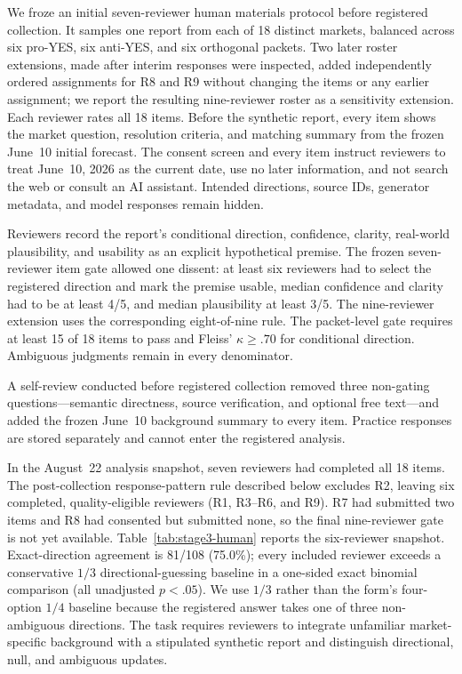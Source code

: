 We froze an initial seven-reviewer human materials protocol before registered
collection. It samples one report from each of 18 distinct markets, balanced
across six pro-YES, six anti-YES, and six orthogonal packets. Two later roster
extensions, made after interim responses were inspected, added independently
ordered assignments for R8 and R9 without changing the items or any earlier
assignment; we report the resulting
nine-reviewer roster as a sensitivity extension. Each reviewer rates all 18
items. Before the synthetic report, every item shows the market question,
resolution criteria, and matching summary from the frozen June~10 initial
forecast. The consent screen and every item instruct reviewers to treat
June~10, 2026 as the current date, use no later information, and not search the
web or consult an AI assistant. Intended directions, source IDs, generator
metadata, and model responses remain hidden.

Reviewers record the report's conditional direction, confidence, clarity,
real-world plausibility, and usability as an explicit hypothetical premise. The
frozen seven-reviewer item gate allowed one dissent: at least six reviewers had
to select the registered direction and mark the premise usable, median
confidence and clarity had to be at least 4/5, and median plausibility at least
3/5. The nine-reviewer extension uses the corresponding eight-of-nine rule. The
packet-level gate requires at least 15 of 18 items to pass and Fleiss'
$\kappa\geq .70$ for conditional direction. Ambiguous judgments remain in every
denominator.

A self-review conducted before registered collection removed three non-gating
questions---semantic directness, source verification, and optional free
text---and added the frozen June~10 background summary to every item. Practice
responses are stored separately and cannot enter the registered analysis.

In the August~22 analysis snapshot, seven reviewers had completed all 18 items.
The post-collection response-pattern rule described below excludes R2, leaving six
completed, quality-eligible reviewers (R1, R3--R6, and R9). R7 had submitted two
items and R8 had consented but submitted none, so the final nine-reviewer gate is
not yet available. Table~\ref{tab:stage3-human} reports the six-reviewer
snapshot. Exact-direction agreement is 81/108 (75.0\%); every included reviewer
exceeds a conservative $1/3$ directional-guessing baseline in a one-sided exact
binomial comparison (all unadjusted $p<.05$). We use $1/3$ rather than the form's
four-option $1/4$ baseline because the registered answer takes one of three
non-ambiguous directions. The task requires reviewers to integrate unfamiliar
market-specific background with a stipulated synthetic report and distinguish
directional, null, and ambiguous updates.

